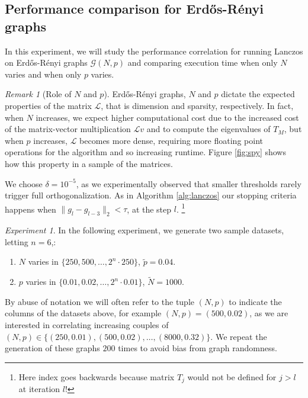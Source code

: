 \documentclass[11pt]{article}
\newcommand{\G}{\mathcal{G}}
\renewcommand{\L}{\mathcal{L}}
\theoremstyle{definition}
\theoremstyle{remark}
\newtheorem{remark}[theorem]{Remark}
\theoremstyle{experimental}
\newtheorem*{experiment}{Experiment}
\begin{document}
\subsection{Performance comparison for Erdős-Rényi graphs}
\label{ssec:ex23}

In this experiment, we will study the performance correlation for running Lanczos on Erdős-Rényi
graphs $ \G(N,p) $ and comparing execution time when only $ N $ varies and when only $ p $ varies. 

\begin{remark}[Role of $ N $ and $ p $]
Erdős-Rényi graphs, $ N $ and $ p $ dictate the expected properties of the matrix $ \L $, that is dimension and
sparsity, respectively. In fact, when $ N $ increases, we expect higher computational cost due
to the increased cost of the matrix-vector multiplication $ \L v $ and to compute the eigenvalues of
$ T_M $, but when $ p $ increases, $ \L
$ becomes more dense, requiring more floating point operations for the algorithm and so increasing
runtime. Figure \ref{fig:spy} shows how this property in a sample of the matrices.
\end{remark}

We choose $ \delta = 10^{-5} $, as we experimentally observed that smaller thresholds rarely
trigger full
orthogonalization. As in Algorithm \ref{alg:lanczos} our stopping criteria happens when $
\|g_l - g_{l-3}\|_2 < \tau $, at the step $
l$. \footnote{Here
index goes backwards because matrix $ T_j $ would not be defined for $ j>l $ at iteration $ l $!}

\begin{experiment}
In the following experiment, we generate two sample datasets, letting $ n = 6 $,:
\begin{enumerate}
  \item $ N $ varies in $ \{ 250,500,\dots,2^n \cdot 250\} $, $ \tilde{p} = 0.04 $.
  \item $ p $ varies in $ \{ 0.01,0.02,\dots,2^n \cdot 0.01 \}$, $ \tilde{N} = 1000$.
\end{enumerate}
By abuse of notation we will often refer to the tuple $ (N,p) $ to indicate the columns of the datasets above, for example $ (N,p) =
(500,0.02) $, as we are interested in correlating increasing couples of $ (N,p)  \in \{ (250,0.01), 
(500,0.02), \ldots,  (8000, 0.32)\}$.
We repeat the generation of these graphs $ 200 $ times to avoid bias from graph randomness.
 
\end{experiment}
\end{document}

